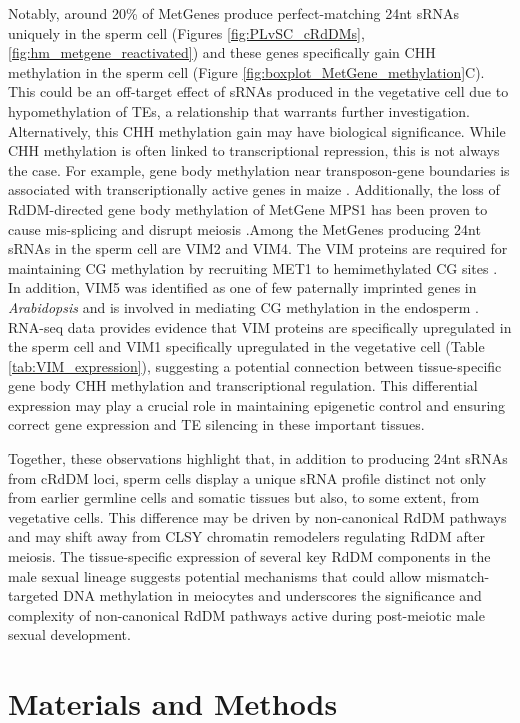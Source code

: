 Notably, around 20\% of MetGenes produce perfect-matching 24nt sRNAs uniquely in the sperm cell (Figures \ref{fig:PLvSC_cRdDMs}, \ref{fig:hm_metgene_reactivated}) and these genes specifically gain CHH methylation in the sperm cell (Figure \ref{fig:boxplot_MetGene_methylation}C). This could be an off-target effect of sRNAs produced in the vegetative cell due to hypomethylation of TEs, a relationship that warrants further investigation. Alternatively, this CHH methylation gain may have biological significance. While CHH methylation is often linked to transcriptional repression, this is not always the case.  For example, gene body methylation near transposon-gene boundaries is associated with transcriptionally active genes in maize \cite{RN277}. Additionally, the loss of RdDM-directed gene body methylation of MetGene MPS1 has been proven to cause mis-splicing and disrupt meiosis \cite{RN199}.Among the MetGenes producing 24nt sRNAs in the sperm cell are VIM2 and VIM4. The VIM proteins are required for maintaining CG methylation by recruiting MET1 to hemimethylated CG sites \cite{RN276}. In addition, VIM5 was identified as one of few paternally imprinted genes in \textit{Arabidopsis} and is involved in mediating CG methylation in the endosperm \cite{RN275}. RNA-seq data provides evidence that VIM proteins are specifically upregulated in the sperm cell and VIM1 specifically upregulated in the vegetative cell (Table \ref{tab:VIM_expression}), suggesting a potential connection between tissue-specific gene body CHH methylation and transcriptional regulation. This differential expression may play a crucial role in maintaining epigenetic control and ensuring correct gene expression and TE silencing in these important tissues.

Together, these observations highlight that, in addition to producing 24nt sRNAs from cRdDM loci, sperm cells display a unique sRNA profile  distinct not only from earlier germline cells and somatic tissues but also, to some extent, from vegetative cells. This difference may be driven by non-canonical RdDM pathways and may shift away from CLSY chromatin remodelers regulating RdDM after meiosis. The tissue-specific expression of several key RdDM components in the male sexual lineage suggests potential mechanisms that could allow mismatch-targeted DNA methylation in meiocytes and underscores the significance and complexity of non-canonical RdDM pathways active during post-meiotic male sexual development.

\clearpage

\section{Materials and Methods}

